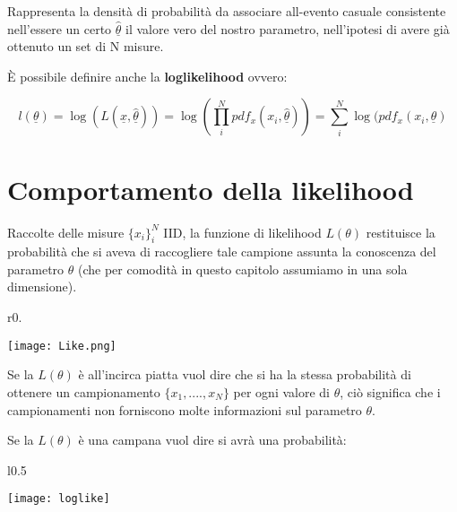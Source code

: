\noindent Rappresenta la densit\`{a} di probabilit\`{a} da associare all-evento casuale consistente nell'essere un certo $\underline{\hat{\theta}}$ il valore vero del nostro parametro, nell'ipotesi di avere gi\`{a} ottenuto un set di N misure.\newline

\noindent \`{E} possibile definire anche la \textbf{loglikelihood} ovvero:

\begin{equation*}
	 l(\underline{\theta})= \log(L(\underline{x},\underline{\hat{\theta}})) = \log(\prod_{i}^N pdf_{x}(x_i,\underline{\hat{\theta}})) = \sum_{i}^N \log(pdf_{x}(x_{i},\underline{\theta})
\end{equation*}

\section{Comportamento della likelihood}

\noindent Raccolte delle misure $\{x_{i}\}_i^N$ IID, la funzione di likelihood $L(\theta)$ restituisce la probabilit\`{a} che si aveva di raccogliere tale campione assunta la conoscenza del parametro $\theta$  (che per comodit\`{a} in questo capitolo assumiamo in una sola dimensione). 
\hspace{0.5in}

\begin{wrapfigure}{r}{0.\textwidth}
\centering

\texttt{[image: Like.png]}	

\end{wrapfigure}

\noindent Se la $L(\theta)$ \`{e} all'incirca piatta vuol dire che  si ha la stessa probabilit\`{a} di ottenere un campionamento $\{x_1,....,x_N\}$ per ogni valore di $\theta$, ci\`{o} significa che i campionamenti non forniscono molte informazioni sul parametro $\theta$.  

\hspace{0.5in}


Se la $L(\theta)$ \`{e} una campana vuol dire si avr\`{a} una probabilit\`{a}:


\begin{wrapfigure}[5]{l}{0.5 \textwidth}

\vspace{-10pt}
\centering
\texttt{[image: loglike]}	

\end{wrapfigure}

